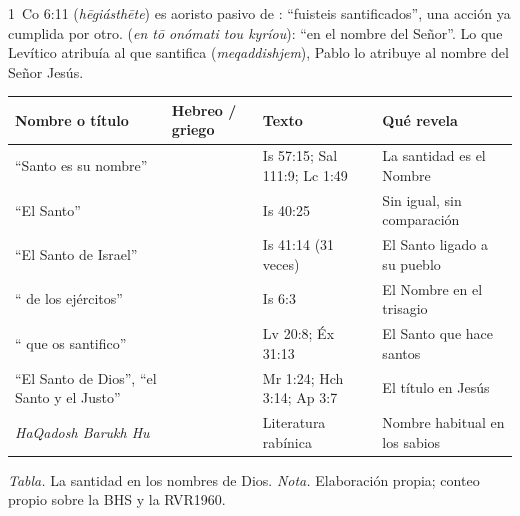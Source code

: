 \begin{filologiatexto}{1~Co 6:11}
 (\emph{hēgiásthēte}) es aoristo pasivo de : ``fuisteis santificados'', una acción ya cumplida por otro.  (\emph{en tō onómati tou kyríou}): ``en el nombre del Señor''. Lo que Levítico atribuía al \SENOR{} que santifica (\emph{meqaddishjem}), Pablo lo atribuye al nombre del Señor Jesús.
\end{filologiatexto}


\begin{center}
\small\renewcommand{\arraystretch}{1.2}
\begin{tabular}{@{}L{4.2cm}L{3.6cm}L{3.0cm}L{4.6cm}@{}}
\toprule
\textbf{Nombre o título} & \textbf{Hebreo / griego} & \textbf{Texto} & \textbf{Qué revela} \\ \midrule
``Santo es su nombre'' &  & Is 57:15; Sal 111:9; Lc 1:49 & La santidad es el Nombre \\
``El Santo'' &  & Is 40:25 & Sin igual, sin comparación \\
``El Santo de Israel'' &  & Is 41:14 (31 veces) & El Santo ligado a su pueblo \\
``\SENOR{} de los ejércitos'' &  & Is 6:3 & El Nombre en el trisagio \\
``\SENOR{} que os santifico'' &  & Lv 20:8; Éx 31:13 & El Santo que hace santos \\
``El Santo de Dios'', ``el Santo y el Justo'' &  & Mr 1:24; Hch 3:14; Ap 3:7 & El título en Jesús \\
\emph{HaQadosh Barukh Hu} &  & Literatura rabínica & Nombre habitual en los sabios \\ \bottomrule
\end{tabular}\par\smallskip
{\footnotesize\color{gris}\textit{Tabla.} La santidad en los nombres de Dios. \textit{Nota.} Elaboración propia; conteo propio sobre la BHS y la RVR1960.}
\end{center}

